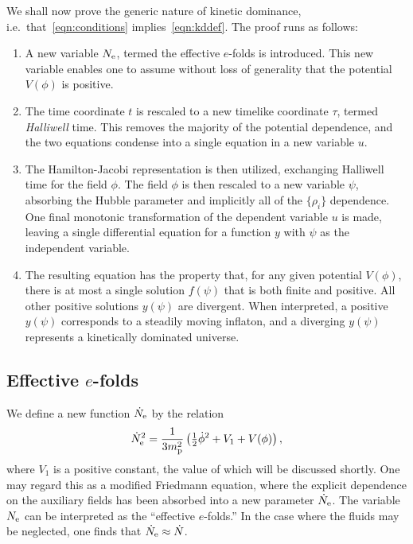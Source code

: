 We shall now prove the generic nature of kinetic dominance, i.e.\ that~\eqref{eqn:conditions} implies~\eqref{eqn:kddef}. The proof runs as follows:
%
\renewcommand{\theenumi}{\Alph{enumi}}
%
\begin{enumerate}
  \item                                        
    A new variable $N_\mathrm{e}$, termed the effective $e$-folds is introduced. This new variable enables one to assume without loss of generality that the potential $V(\phi)$ is positive.
  \item
    The time coordinate $t$ is rescaled to a new timelike coordinate $\tau$, termed {\em Halliwell\/} time. This removes the majority of the potential dependence, and the two equations condense into a single equation in a new variable $u$.
  \item
    The Hamilton-Jacobi representation is then utilized, exchanging Halliwell time for the field $\phi$. The field $\phi$ is then rescaled to a new variable $\psi$, absorbing the Hubble parameter and implicitly all of the $\{\rho_i\}$ dependence. One final monotonic transformation of the dependent variable $u$ is made, leaving a single differential equation for a function $y$ with $\psi$ as the independent variable.
  \item
    The resulting equation has the property that, for any given potential $V(\phi)$, there is at most a single solution $f(\psi)$ that is both finite and positive. All other positive solutions $y(\psi)$ are divergent.  When interpreted, a positive $y(\psi)$ corresponds to a steadily moving inflaton, and a diverging $y(\psi)$ represents a kinetically dominated universe.
\end{enumerate}
%


\subsection{Effective $e$-folds}
We define a new function $\dot{N}_\mathrm{e}$ by the relation
%
\begin{equation}
  \dot{N}_\mathrm{e}^2 = 
  \frac{1}{3m_{\mathrm{p}}^2}\left({\textstyle\frac{1}{2}}\dot{\phi}^2 + V_1+V(\phi) \right),
  \label{eqn:Friedmann_c} 
\end{equation}
%
where $V_1$ is a positive constant, the value of which will be discussed shortly. One may regard this as a modified Friedmann equation, where the explicit dependence on the auxiliary fields has been absorbed into a new parameter $\dot{N}_\mathrm{e}$. The variable $N_\mathrm{e}$ can be interpreted as the ``effective $e$-folds.'' In the case where the fluids may be neglected, one finds that $\dot{N}_\mathrm{e}\approx\dot{N}$.

